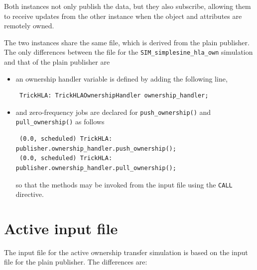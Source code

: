 Both instances not only publish the \simplesine data, but they also
subscribe, allowing them to receive updates from the other instance
when the object and attributes are remotely owned.

The two instances share the same \sdefine file, which is derived from
the plain publisher.
The only differences between the \sdefine file for the
{\tt SIM\_simplesine\_hla\_own} simulation
and that of the plain publisher are

\begin{itemize}
\item{
  an ownership handler variable is defined by adding the following line,
  \begin{verbatim}
 TrickHLA: TrickHLAOwnershipHandler ownership_handler; \end{verbatim}
}
\item{
  and zero-frequency jobs are declared for
  {\tt push\_ownership()} and {\tt pull\_ownership()}
  as follows
  \begin{verbatim}
 (0.0, scheduled) TrickHLA: publisher.ownership_handler.push_ownership();
 (0.0, scheduled) TrickHLA: publisher.ownership_handler.pull_ownership(); \end{verbatim}
  so that the methods may be invoked from the input file using the
  {\tt CALL} directive.
}
\end{itemize}

\section{Active input file}

The input file for the active ownership transfer simulation is
based on the input file for the plain publisher.
The differences are:

